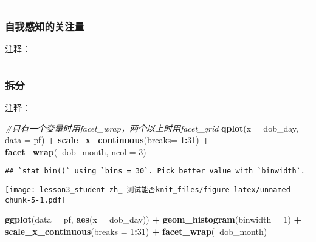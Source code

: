 \documentclass[]{article}
\newenvironment{Shaded}{\begin{snugshade}}{\end{snugshade}}
\newcommand{\CommentTok}[1]{\textcolor[rgb]{0.56,0.35,0.01}{\textit{#1}}}
\newcommand{\DataTypeTok}[1]{\textcolor[rgb]{0.13,0.29,0.53}{#1}}
\newcommand{\DecValTok}[1]{\textcolor[rgb]{0.00,0.00,0.81}{#1}}
\newcommand{\KeywordTok}[1]{\textcolor[rgb]{0.13,0.29,0.53}{\textbf{#1}}}
\newcommand{\NormalTok}[1]{#1}
\newcommand{\OperatorTok}[1]{\textcolor[rgb]{0.81,0.36,0.00}{\textbf{#1}}}
\newcommand{\StringTok}[1]{\textcolor[rgb]{0.31,0.60,0.02}{#1}}
\begin{document}
\begin{center}\rule{0.5\linewidth}{\linethickness}\end{center}

\subsubsection{自我感知的关注量}

注释：

\begin{center}\rule{0.5\linewidth}{\linethickness}\end{center}

\subsubsection{拆分}

注释：

\begin{Shaded}
\begin{Highlighting}[]
\CommentTok{#只有一个变量时用facet_wrap，两个以上时用facet_grid}
\KeywordTok{qplot}\NormalTok{(}\DataTypeTok{x =}\NormalTok{ dob_day, }\DataTypeTok{data =}\NormalTok{ pf) }\OperatorTok{+}
\StringTok{  }\KeywordTok{scale_x_continuous}\NormalTok{(}\DataTypeTok{breaks=} \DecValTok{1}\OperatorTok{:}\DecValTok{31}\NormalTok{) }\OperatorTok{+}
\StringTok{  }\KeywordTok{facet_wrap}\NormalTok{(}\OperatorTok{~}\NormalTok{dob_month, }\DataTypeTok{ncol =} \DecValTok{3}\NormalTok{)}
\end{Highlighting}
\end{Shaded}

\begin{verbatim}
## `stat_bin()` using `bins = 30`. Pick better value with `binwidth`.
\end{verbatim}

\texttt{[image: lesson3\_student-zh\_-测试能否knit\_files/figure-latex/unnamed-chunk-5-1.pdf]}

\begin{Shaded}
\begin{Highlighting}[]
\KeywordTok{ggplot}\NormalTok{(}\DataTypeTok{data =}\NormalTok{ pf, }\KeywordTok{aes}\NormalTok{(}\DataTypeTok{x =}\NormalTok{ dob_day)) }\OperatorTok{+}\StringTok{ }
\StringTok{  }\KeywordTok{geom_histogram}\NormalTok{(}\DataTypeTok{binwidth =} \DecValTok{1}\NormalTok{) }\OperatorTok{+}\StringTok{ }
\StringTok{  }\KeywordTok{scale_x_continuous}\NormalTok{(}\DataTypeTok{breaks =} \DecValTok{1}\OperatorTok{:}\DecValTok{31}\NormalTok{) }\OperatorTok{+}\StringTok{ }
\StringTok{  }\KeywordTok{facet_wrap}\NormalTok{(}\OperatorTok{~}\NormalTok{dob_month)}
\end{Highlighting}
\end{Shaded}
\end{document}

